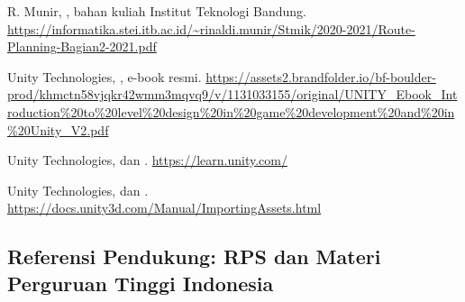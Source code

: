\begin{sloppypar}
\begin{enumerate}[label={[R\arabic*]}, leftmargin=3.2em, itemsep=4pt, topsep=4pt]
  \item R. Munir, , bahan
        kuliah Institut Teknologi Bandung.
        \url{https://informatika.stei.itb.ac.id/~rinaldi.munir/Stmik/2020-2021/Route-Planning-Bagian2-2021.pdf}

  \item Unity Technologies, , e-book resmi.
        \url{https://assets2.brandfolder.io/bf-boulder-prod/khmctn58vjqkr42wmm3mqvq9/v/1131033155/original/UNITY_Ebook_Introduction%20to%20level%20design%20in%20game%20development%20and%20in%20Unity_V2.pdf}

  \item Unity Technologies,  dan
        .
        \url{https://learn.unity.com/}

  \item Unity Technologies,  dan
        .
        \url{https://docs.unity3d.com/Manual/ImportingAssets.html}
\end{enumerate}
\end{sloppypar}

\subsection{Referensi Pendukung: RPS dan Materi Perguruan Tinggi Indonesia}

